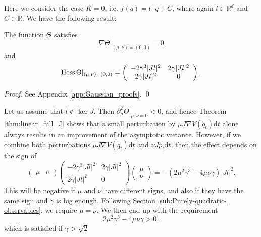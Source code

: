 Here we consider the case $K=0$, i.e. $f(q)=l\cdot q+C$, where
again $l\in\mathbb{R}^{d}$ and $C\in\mathbb{R}$. We have the following
result: 
\begin{proposition}
	\label{thm:linear_full_J}The function $\Theta$ satisfies 
	\[
	\nabla\Theta\vert_{(\mu,\nu)=(0,0)}=0
	\]
	and 
	\[
	\operatorname{Hess}\Theta\vert_{(\mu,\nu)=(0,0)}=\left(\begin{array}{cc}
	-2\gamma^{3}\vert Jl\vert^{2} & 2\gamma\vert Jl\vert^{2}\\
	2\gamma\vert Jl\vert^{2} & 0
	\end{array}\right).
	\]
\end{proposition}
\begin{proof}
	See Appendix \ref{app:Gaussian_proofs}.
	\qed
\end{proof}
	Let us assume that $l\notin\ker J$. Then $\partial_{\mu}^{2}\Theta\vert_{\mu,\nu=0}<0$,
	and hence Theorem \ref{thm:linear_full_J} shows that a small perturbation
	by $\mu J\nabla V(q_{t})\mathrm{d}t$ alone always results in an improvement
	of the asymptotic variance. However, if we combine both perturbations
	$\mu J\nabla V(q_{t})\mathrm{d}t$ and $\nu Jp_{t}\mathrm{d}t$, then
	the effect depends on the sign of 
	\[
	\left(\begin{array}{cc}
	\mu & \nu\end{array}\right)\left(\begin{array}{cc}
	-2\gamma^{3}\vert Jl\vert^{2} & 2\gamma\vert Jl\vert^{2}\\
	2\gamma\vert Jl\vert^{2} & 0
	\end{array}\right)\left(\begin{array}{c}
	\mu\\
	\nu
	\end{array}\right)=-(2\mu^{2}\gamma^{3}-4\mu\nu\gamma)\vert Jl\vert^{2}.
	\]
	This will be negative if $\mu$ and $\nu$ have different signs, and
	also if they have the same sign and $\gamma$ is big enough.
Following Section \ref{sub:Purely-quadratic-observables}, we require
$\mu=\nu$. We then end up with the requirement 
\[
2\mu^{2}\gamma^{3}-4\mu\nu\gamma>0,
\]
which is satisfied if $\gamma>\sqrt{2}$

